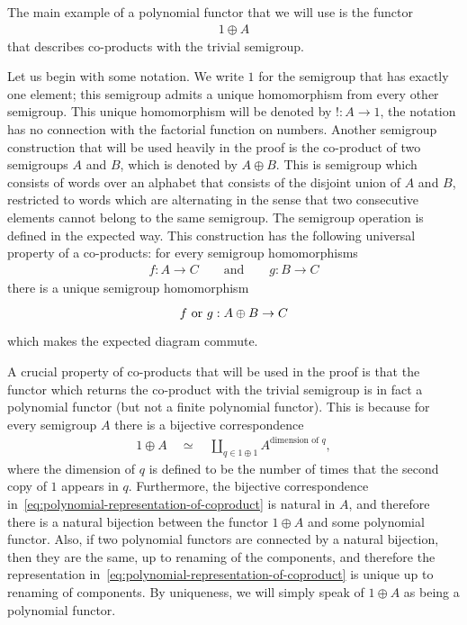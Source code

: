 \begin{myexample}\label{ex:co-product-as-polynomial-functor}
    The main example of a polynomial functor that we will use is the functor
    \begin{align*}
    1 \oplus A
    \end{align*}
    that describes co-products with the trivial semigroup. 
    
    Let us begin with some notation. We write $1$ for the semigroup that has exactly one element; this semigroup admits a unique homomorphism from every other semigroup. This unique homomorphism will be denoted by $! : A \to 1$, the notation has no connection with the factorial function on numbers. Another semigroup construction that will be used heavily in the proof is the co-product of two semigroups $A$ and $B$, which is denoted by $A \oplus B$. This is semigroup which consists of words over an alphabet that consists of the disjoint union of $A$ and $B$, restricted to words which are alternating in the sense that two consecutive elements cannot belong to the same semigroup. The semigroup operation is defined in the expected way. This construction has the following universal property of a co-products: for every semigroup homomorphisms 
    \begin{align*}
    f : A \to C \qquad \text{and} \qquad g : B \to C
    \end{align*}
    there is a unique semigroup homomorphism
    \[
    \begin{tikzcd}
    f \text{ or } g : A \oplus B \to C
    \end{tikzcd}
    \]
    which makes the expected diagram commute. 
    
    A crucial property of co-products that will be used in the proof is that the functor which returns the co-product with the trivial semigroup is in fact a polynomial functor (but not a finite polynomial functor).  This is because for every semigroup $A$ there is a bijective correspondence 
    \begin{align}\label{eq:polynomial-representation-of-coproduct}
    1 \oplus A \quad \simeq \quad \coprod_{q \in 1 \oplus 1} A^{\text{dimension of $q$}},
    \end{align}
    where the dimension of $q$ is defined to be the number of times that the second copy of $1$ appears in $q$. Furthermore, the bijective correspondence in~\eqref{eq:polynomial-representation-of-coproduct} is natural in $A$, and therefore there is a natural bijection between the functor $1 \oplus A$ and some polynomial functor. Also, if two polynomial functors are connected by a natural bijection, then they are the same, up to renaming of the components, and therefore the representation in~\eqref{eq:polynomial-representation-of-coproduct} is unique up to renaming of components. By uniqueness, we will simply speak of $1 \oplus A$ as being a polynomial functor. 
\end{myexample}




